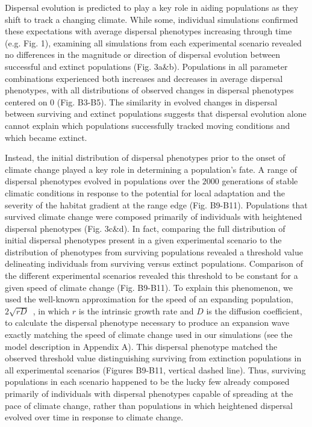 \documentclass[11pt]{article}
\begin{document}
Dispersal evolution is predicted to play a key role in aiding populations as they shift to track a changing climate. While some, individual simulations confirmed these expectations with average dispersal phenotypes increasing through time (e.g. Fig. 1), examining all simulations from each experimental scenario revealed no differences in the magnitude or direction of dispersal evolution between successful and extinct populations (Fig. 3a\&b). Populations in all parameter combinations experienced both increases and decreases in average dispersal phenotypes, with all distributions of observed changes in dispersal phenotypes centered on $0$ (Fig. B3-B5). The similarity in evolved changes in dispersal between surviving and extinct populations suggests that dispersal evolution alone cannot explain which populations successfully tracked moving conditions and which became extinct.

Instead, the initial distribution of dispersal phenotypes prior to the onset of climate change played a key role in determining a population's fate. A range of dispersal phenotypes evolved in populations over the $2000$ generations of stable climatic conditions in response to the potential for local adaptation and the severity of the habitat gradient at the range edge (Fig. B9-B11). Populations that survived climate change were composed primarily of individuals with heightened dispersal phenotypes (Fig. 3c\&d). In fact, comparing the full distribution of initial dispersal phenotypes present in a given experimental scenario to the distribution of phenotypes from surviving populations revealed a threshold value delineating individuals from surviving versus extinct populations. Comparison of the different experimental scenarios revealed this threshold to be constant for a given speed of climate change (Fig. B9-B11). To explain this phenomenon, we used the well-known approximation for the speed of an expanding population, $2\sqrt{rD}$~\citep{hastings2005spatial}, in which $r$ is the intrinsic growth rate and $D$ is the diffusion coefficient, to calculate the dispersal phenotype necessary to produce an expansion wave exactly matching the speed of climate change used in our simulations (see the model description in Appendix A). This dispersal phenotype matched the observed threshold value distinguishing surviving from extinction populations in all experimental scenarios (Figures B9-B11, vertical dashed line). Thus, surviving populations in each scenario happened to be the lucky few already composed primarily of individuals with dispersal phenotypes capable of spreading at the pace of climate change, rather than populations in which heightened dispersal evolved over time in response to climate change.
\end{document}
